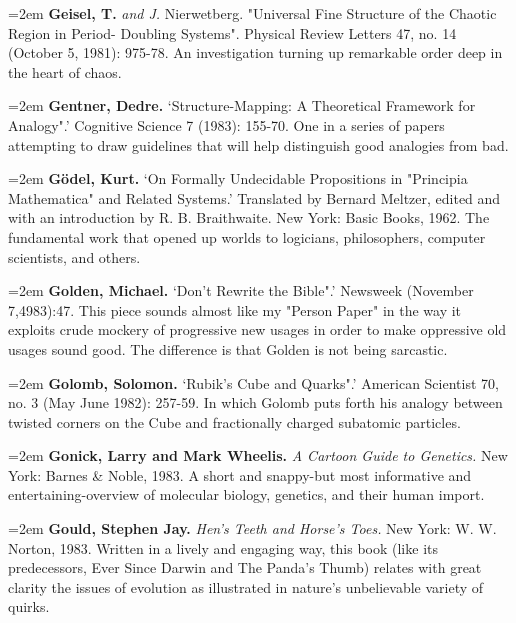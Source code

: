 \par\noindent\hangindent=2em {\bf Geisel, T.} {\it and J.} Nierwetberg. "Universal Fine Structure of the Chaotic Region in Period- Doubling Systems". Physical Review Letters 47, no. 14 (October 5, 1981): 975-78. An investigation turning up remarkable order deep in the heart of chaos.

\par\noindent\hangindent=2em {\bf Gentner, Dedre.} `Structure-Mapping: A Theoretical Framework for Analogy".' Cognitive Science 7 (1983): 155-70. One in a series of papers attempting to draw guidelines that will help distinguish good analogies from bad.

\par\noindent\hangindent=2em {\bf Gödel, Kurt.} `On Formally Undecidable Propositions in "Principia Mathematica" and Related Systems.' Translated by Bernard Meltzer, edited and with an introduction by R. B. Braithwaite. New York: Basic Books, 1962. The fundamental work that opened up worlds to logicians, philosophers, computer scientists, and others.

\par\noindent\hangindent=2em {\bf Golden, Michael.} `Don't Rewrite the Bible".' Newsweek (November 7,4983):47. This piece sounds almost like my "Person Paper" in the way it exploits crude mockery of progressive new usages in order to make oppressive old usages sound good. The difference is that Golden is not being sarcastic.

\par\noindent\hangindent=2em {\bf Golomb, Solomon.} `Rubik's Cube and Quarks".' American Scientist 70, no. 3 (May June 1982): 257-59. In which Golomb puts forth his analogy between twisted corners on the Cube and fractionally charged subatomic particles.

\par\noindent\hangindent=2em {\bf Gonick, Larry and Mark Wheelis.} {\it A Cartoon Guide to Genetics.} New York: Barnes \& Noble, 1983. A short and snappy-but most informative and entertaining-overview of molecular biology, genetics, and their human import.

\par\noindent\hangindent=2em {\bf Gould, Stephen Jay.} {\it Hen's Teeth and Horse's Toes.} New York: W. W. Norton, 1983. Written in a lively and engaging way, this book (like its predecessors, Ever Since Darwin and The Panda's Thumb) relates with great clarity the issues of evolution as illustrated in nature's unbelievable variety of quirks.

